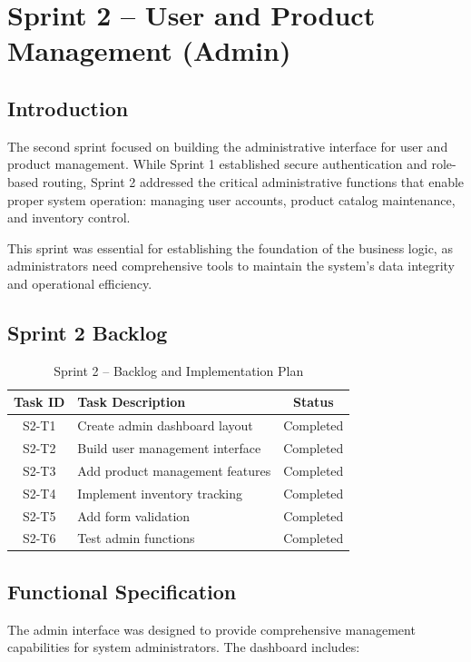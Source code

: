 \chapter{Sprint 2 – User and Product Management (Admin)}

\section{Introduction}

The second sprint focused on building the administrative interface for user and product management. While Sprint 1 established secure authentication and role-based routing, Sprint 2 addressed the critical administrative functions that enable proper system operation: managing user accounts, product catalog maintenance, and inventory control.

This sprint was essential for establishing the foundation of the business logic, as administrators need comprehensive tools to maintain the system's data integrity and operational efficiency.

\section{Sprint 2 Backlog}

\begin{table}[H]
\centering
\begin{tabular}{|c|p{10cm}|c|}
\hline
\textbf{Task ID} & \textbf{Task Description} & \textbf{Status} \\
\hline
S2-T1 & Create admin dashboard layout & Completed \\
S2-T2 & Build user management interface & Completed \\
S2-T3 & Add product management features & Completed \\
S2-T4 & Implement inventory tracking & Completed \\
S2-T5 & Add form validation & Completed \\
S2-T6 & Test admin functions & Completed \\
\hline
\end{tabular}
\caption{Sprint 2 – Backlog and Implementation Plan}
\label{tab:sprint2-backlog}
\end{table}

\section{Functional Specification}

The admin interface was designed to provide comprehensive management capabilities for system administrators. The dashboard includes:

